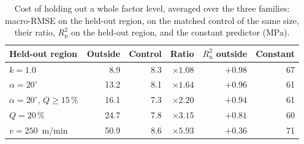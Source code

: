 \documentclass[subscriptcorrection,upint,varvw,barcolor=Goldenrod3,mathalfa=cal=euler,balance,hyphenate,french,pdf-a]{asmejour} %
\begin{document}
\begin{table}[t]
\caption[Cost of holding out a whole factor level]{Cost of holding out a whole factor level, averaged over the three families: macro-RMSE on the held-out region, on the matched control of the same size, their ratio, $R^2_{\mathrm{n}}$ on the held-out region, and the constant predictor (MPa).} %
\label{tab:axis}
\centering\small
\begin{tabular}{@{}lrrrrr@{}}
\toprule
Held-out region & Outside & Control & Ratio & $R^2_{\mathrm{n}}$ outside & Constant \\
\midrule
$k=1.0$                              & 8.9  & 8.3 & $\times1.08$ & $+0.98$ & 67 \\
$\alpha=20^\circ$                    & 13.2 & 8.1 & $\times1.64$ & $+0.96$ & 61 \\
$\alpha=20^\circ$, $Q\ge15\,\%$        & 16.1 & 7.3 & $\times2.20$ & $+0.94$ & 61 \\
$Q=20\,\%$                             & 24.7 & 7.8 & $\times3.15$ & $+0.81$ & 60 \\
$v=250$~m/min                        & 50.9 & 8.6 & $\times5.93$ & $+0.36$ & 71 \\
\bottomrule
\end{tabular}
\end{table}
\end{document}
